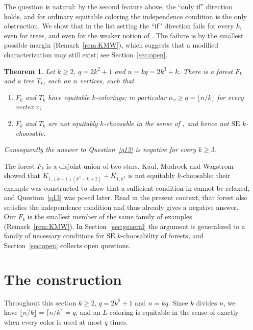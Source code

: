 \documentclass[11pt]{article}
\newtheorem{theorem}{Theorem}
\theoremstyle{definition}
\newcommand{\SE}{\mathrm{SE}}
\begin{document}
The question is natural: by the second feature above, the ``only if'' direction holds,
and for ordinary equitable coloring the independence condition is the only obstruction.
We show that in the list setting the ``if'' direction fails for every $k$, even for
trees, and even for the weaker notion of \cite{KPW}. The failure is by the smallest
possible margin (Remark~\ref{rem:KMW}), which suggests that a modified characterization
may still exist; see Section~\ref{sec:open}.

\begin{theorem}\label{thm:main}
Let $k\ge 2$, $q=2k^2+1$ and $n=kq=2k^3+k$. There is a forest $F_k$ and a tree $T_k$, each
on $n$ vertices, such that
\begin{enumerate}
\item[\textup{(i)}] $F_k$ and $T_k$ have equitable $k$-colorings; in particular
  $\alpha_v\ge q=\lfloor n/k\rfloor$ for every vertex $v$;
\item[\textup{(ii)}] $F_k$ and $T_k$ are not equitably $k$-choosable in the sense of
  \cite{KPW}, and hence not $\SE$ $k$-choosable.
\end{enumerate}
Consequently the answer to Question~\ref{q13} is negative for every $k\ge 3$.
\end{theorem}

The forest $F_k$ is a disjoint union of two stars. Kaul, Mudrock and Wagstrom
\cite[Proposition~22]{KMW} showed that $K_{1,(k-1)(k^3-k+2)}+K_{1,k^3}$ is not equitably
$k$-choosable; their example was constructed to show that a sufficient condition in
\cite{KMW} cannot be relaxed, and Question~\ref{q13} was posed later. Read in the
present context, that forest also satisfies the independence condition and thus already
gives a negative answer. Our $F_k$ is the smallest member of the same family of examples
(Remark~\ref{rem:KMW}). In Section~\ref{sec:general}
the argument is generalized to a family of necessary conditions for $\SE$
$k$-choosability of forests, and Section~\ref{sec:open} collects open questions.

\section{The construction}\label{sec:construction}

Throughout this section $k\ge 2$, $q=2k^2+1$ and $n=kq$. Since $k$ divides $n$, we have
$\lfloor n/k\rfloor=\lceil n/k\rceil=q$, and an $L$-coloring is equitable in the sense of
\cite{KPW} exactly when every color is used at most $q$ times.
\end{document}
